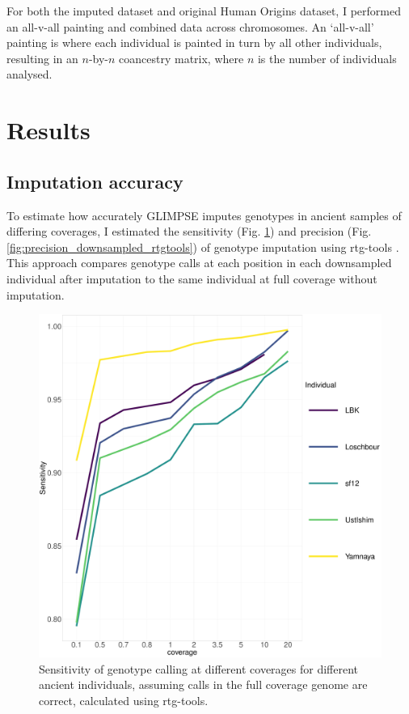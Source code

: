 {For both the imputed dataset and original Human Origins dataset, I performed an all-v-all painting and combined data across chromosomes. An `all-v-all' painting is where each individual is painted in turn by all other individuals, resulting in an $n$-by-$n$ coancestry matrix, where $n$ is the number of individuals analysed.


\section{Results}

\subsection{Imputation accuracy}

To estimate how accurately GLIMPSE imputes genotypes in ancient samples of differing coverages, I estimated the sensitivity (Fig. \ref{fig:Sensitivity_downsampled_rtgtools}) and precision (Fig.  \ref{fig:precision_downsampled_rtgtools}) of genotype imputation using rtg-tools \cite{cleary2014joint}. This approach compares genotype calls at each position in each downsampled individual after imputation to the same individual at full coverage without imputation.

\begin{figure}[htp]
    \centering
    \includegraphics[width=1.0\textwidth]{../images/chapter1/allDownsampled_rtgtools_sensitivity.pdf}
    \caption{Sensitivity of genotype calling at different coverages for different ancient individuals, assuming calls in the full coverage genome are correct,  calculated using rtg-tools.}
    \label{fig:Sensitivity_downsampled_rtgtools}
\end{figure}

}
